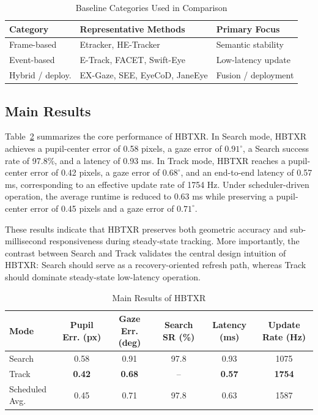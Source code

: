 \documentclass[journal]{IEEEtran}
\begin{document}
\begin{table}[t]
\caption{Baseline Categories Used in Comparison}
\label{tab:baseline}
\centering
\footnotesize
\begin{tabular}{p{}p{}p{}}
\toprule
Category & Representative Methods & Primary Focus \\
\midrule
Frame-based & Etracker, HE-Tracker & Semantic stability \\
Event-based & E-Track, FACET, Swift-Eye & Low-latency update \\
Hybrid / deploy. & EX-Gaze, SEE, EyeCoD, JaneEye & Fusion / deployment \\
\bottomrule
\end{tabular}
\end{table}

\subsection{Main Results}
Table~\ref{tab:main} summarizes the core performance of HBTXR. In Search mode, HBTXR achieves a pupil-center error of 0.58 pixels, a gaze error of $0.91^{\circ}$, a Search success rate of 97.8\%, and a latency of 0.93 ms. In Track mode, HBTXR reaches a pupil-center error of 0.42 pixels, a gaze error of $0.68^{\circ}$, and an end-to-end latency of 0.57 ms, corresponding to an effective update rate of 1754 Hz. Under scheduler-driven operation, the average runtime is reduced to 0.63 ms while preserving a pupil-center error of 0.45 pixels and a gaze error of $0.71^{\circ}$.

These results indicate that HBTXR preserves both geometric accuracy and sub-millisecond responsiveness during steady-state tracking. More importantly, the contrast between Search and Track validates the central design intuition of HBTXR: Search should serve as a recovery-oriented refresh path, whereas Track should dominate steady-state low-latency operation.

\begin{table}[t]
\caption{Main Results of HBTXR}
\label{tab:main}
\centering
\footnotesize
\begin{tabular}{p{}c c c c c}
\toprule
Mode & Pupil Err. (px) & Gaze Err. (deg) & Search SR (\%) & Latency (ms) & Update Rate (Hz) \\
\midrule
Search & 0.58 & 0.91 & 97.8 & 0.93 & 1075 \\
Track & \textbf{0.42} & \textbf{0.68} & -- & \textbf{0.57} & \textbf{1754} \\
Scheduled Avg. & 0.45 & 0.71 & 97.8 & 0.63 & 1587 \\
\bottomrule
\end{tabular}
\end{table}
\end{document}

